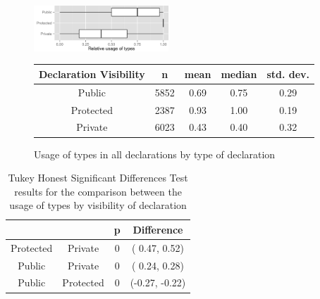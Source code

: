 \documentclass[]{sigplanconf}
\renewcommand{\arraystretch}{1.2}
\begin{document}
\begin{figure}[h]
\centering 
\includegraphics[width=0.45\textwidth]{../analysis/result/all/boxplots/23_declarations_by_visibility.png} 


\vspace{0.3cm}

\renewcommand{\arraystretch}{1.2}
\small
\begin{tabular}{|c|c|c|c|c|}
\hline
Declaration Visibility	& n		& mean	& median	& std. dev.	\\
\hline
\hline
Public    				& 5852	& 0.69	& 0.75		& 0.29		\\ \hline
Protected 				& 2387	& 0.93	& 1.00		& 0.19		\\ \hline
Private   				& 6023	& 0.43	& 0.40		& 0.32		\\ \hline
\end{tabular}
\caption{Usage of types in all declarations by type of declaration}
\label{fig:all_boxplot_visibility_all} 
\end{figure}


\begin{table}[h]

\centering{}%
\renewcommand{\arraystretch}{1.2}
\small
\begin{tabular}{|c|c|c|c|}
\hline 
								& {}		& p		& Difference	\\
\hline
\hline
Protected & Private & 0 & ( 0.47,  0.52) \\ \hline
Public & Private & 0 & ( 0.24,  0.28) \\ \hline
Public & Protected & 0 & (-0.27, -0.22) \\ \hline
\end{tabular}
\caption{Tukey Honest Significant Differences Test results for the comparison between the usage of types by visibility of declaration}
\label{tab:all_utest_visibility}
\end{table}
\end{document}
